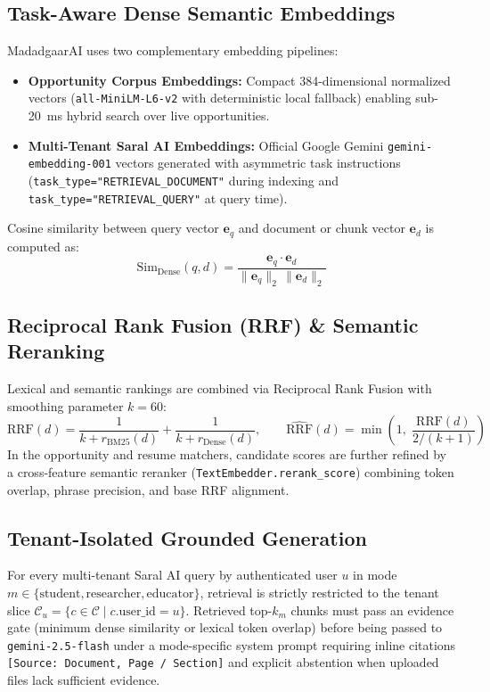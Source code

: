 \documentclass[12pt,a4paper,oneside]{report}
\begin{document}
\subsection{Task-Aware Dense Semantic Embeddings}
MadadgaarAI uses two complementary embedding pipelines:
\begin{itemize}[itemsep=2pt]
    \item \textbf{Opportunity Corpus Embeddings:} Compact 384-dimensional normalized vectors (\texttt{all-MiniLM-L6-v2} \cite{reimers2019sentencebert} with deterministic local fallback) enabling sub-20~ms hybrid search over live opportunities.
    \item \textbf{Multi-Tenant Saral AI Embeddings:} Official Google Gemini \texttt{gemini-embedding-001} vectors \cite{gemini_api} generated with asymmetric task instructions (\texttt{task\_type="RETRIEVAL\_DOCUMENT"} during indexing and \texttt{task\_type="RETRIEVAL\_QUERY"} at query time).
\end{itemize}
Cosine similarity between query vector $\mathbf{e}_q$ and document or chunk vector $\mathbf{e}_d$ is computed as:
\begin{equation}
    \text{Sim}_{\text{Dense}}(q, d) = \frac{\mathbf{e}_q \cdot \mathbf{e}_d}{\|\mathbf{e}_q\|_2 \, \|\mathbf{e}_d\|_2}
\end{equation}

\subsection{Reciprocal Rank Fusion (RRF) \& Semantic Reranking}
Lexical and semantic rankings are combined via Reciprocal Rank Fusion \cite{cormack2009rrf} with smoothing parameter $k = 60$:
\begin{equation}
    \text{RRF}(d) = \frac{1}{k + r_{\text{BM25}}(d)} + \frac{1}{k + r_{\text{Dense}}(d)}, \qquad \widehat{\text{RRF}}(d) = \min\!\left(1,\; \frac{\text{RRF}(d)}{2 / (k + 1)}\right)
\end{equation}
In the opportunity and resume matchers, candidate scores are further refined by a cross-feature semantic reranker (\texttt{TextEmbedder.rerank\_score}) combining token overlap, phrase precision, and base RRF alignment.

\subsection{Tenant-Isolated Grounded Generation}
For every multi-tenant Saral AI query by authenticated user $u$ in mode $m \in \{\text{student}, \text{researcher}, \text{educator}\}$, retrieval is strictly restricted to the tenant slice $\mathcal{C}_u = \{c \in \mathcal{C} \mid c.\text{user\_id} = u\}$. Retrieved top-$k_m$ chunks must pass an evidence gate (minimum dense similarity or lexical token overlap) before being passed to \texttt{gemini-2.5-flash} under a mode-specific system prompt requiring inline citations \texttt{[Source: Document, Page / Section]} and explicit abstention when uploaded files lack sufficient evidence.
\end{document}
